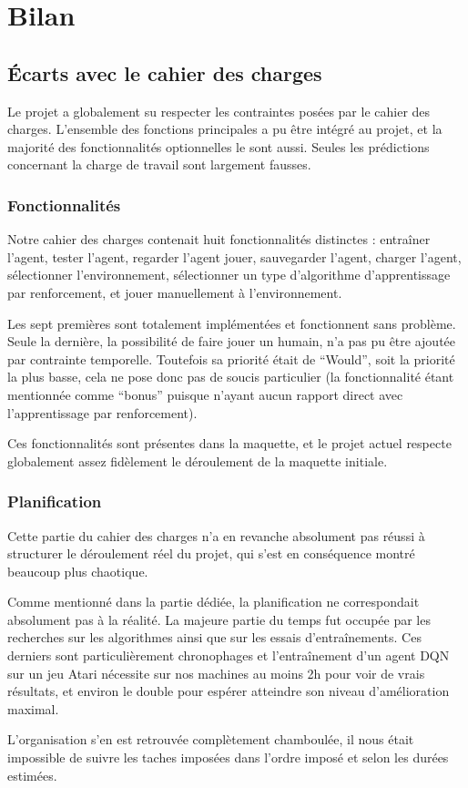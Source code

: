 \chapter{Bilan}

\section{Écarts avec le cahier des charges}

Le projet a globalement su respecter les contraintes posées par le cahier des charges. L'ensemble des fonctions principales a pu être intégré au projet, et la majorité des fonctionnalités optionnelles le sont aussi. Seules les prédictions concernant la charge de travail sont largement fausses.

\subsection{Fonctionnalités}
Notre cahier des charges contenait huit fonctionnalités distinctes : entraîner l'agent, tester l'agent, regarder l'agent jouer, sauvegarder l'agent, charger l'agent, sélectionner l'environnement,  sélectionner un type d'algorithme d'apprentissage par renforcement, et jouer manuellement à l'environnement.
\par
Les sept premières sont totalement implémentées et fonctionnent sans problème. Seule la dernière, la possibilité de faire jouer un humain, n'a pas pu être ajoutée par contrainte temporelle. Toutefois sa priorité était de ``Would'', soit la priorité la plus basse, cela ne pose donc pas de soucis particulier (la fonctionnalité étant mentionnée comme ``bonus'' puisque n'ayant aucun rapport direct avec l'apprentissage par renforcement).
\par
Ces fonctionnalités sont présentes dans la maquette, et le projet actuel respecte globalement assez fidèlement le déroulement de la maquette initiale.


\subsection{Planification}
Cette partie du cahier des charges n'a en revanche absolument pas réussi à structurer le déroulement réel du projet, qui s'est en conséquence montré beaucoup plus chaotique.
\par
Comme mentionné dans la partie dédiée, la planification ne correspondait absolument pas à la réalité. La majeure partie du temps fut occupée par les recherches sur les algorithmes ainsi que sur les essais d'entraînements. Ces derniers sont particulièrement chronophages et l'entraînement d'un agent DQN sur un jeu Atari nécessite sur nos machines au moins 2h pour voir de vrais résultats, et environ le double pour espérer atteindre son niveau d'amélioration maximal.
\par 
L'organisation s'en est retrouvée complètement chamboulée, il nous était impossible de suivre les taches imposées dans l'ordre imposé et selon les durées estimées.


